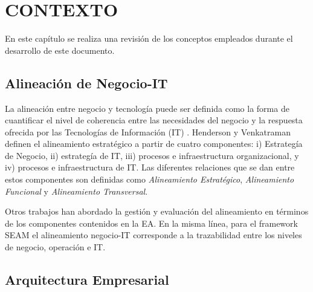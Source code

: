 \chapter{CONTEXTO} \label{cha:background}

En este cap\'itulo se realiza una revisi\'on de los conceptos empleados durante el desarrollo de este documento. 

\section{Alineaci\'on de Negocio-IT} \label{sec:bitalignment}
La alineaci\'on entre negocio y tecnolog\'ia puede ser definida como la forma de cuantificar el nivel de coherencia entre las necesidades del negocio y la respuesta ofrecida por las Tecnolog\'ias de Informaci\'on (IT) \cite{Pereira:2003}. Henderson y Venkatraman \cite{henderson:1990} definen el alineamiento estrat\'egico a partir de cuatro componentes: i) Estrateg\'ia de Negocio, ii) estrateg\'ia de IT, iii) procesos e infraestructura organizacional, y iv) procesos e infraestructura de IT. Las diferentes relaciones que se dan entre estos componentes son definidas como \textit{Alineamiento Estrat\'egico}, \textit{Alineamiento Funcional} y \textit{Alineamiento Transversal}.

Otros trabajos \cite{Pereira:2005, Wang:2008, Wang:20082, Plazaola:2008} han abordado la gesti\'on y evaluaci\'on del alineamiento en t\'erminos de los componentes contenidos en la EA. En la misma l\'inea, para el framework SEAM \cite{Wegmann:2005} el alineamiento negocio-IT corresponde a la trazabilidad entre los niveles de negocio, operaci\'on e IT. 

\section{Arquitectura Empresarial} \label{sec:eamda}

